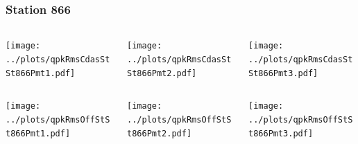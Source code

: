 \documentclass[aspectratio=169]{beamer}
\begin{document}
\begin{frame} 
  \frametitle{Station 866}
  \begin{center}
    \begin{columns}
      \begin{column}{0.33\textwidth}
        \texttt{[image: ../plots/qpkRmsCdasStSt866Pmt1.pdf]}
      \end{column}
      \begin{column}{0.33\textwidth}
        \texttt{[image: ../plots/qpkRmsCdasStSt866Pmt2.pdf]}
      \end{column}
      \begin{column}{0.33\textwidth}
        \texttt{[image: ../plots/qpkRmsCdasStSt866Pmt3.pdf]}
      \end{column}
    \end{columns}
  \end{center}

  \begin{center}
    \begin{columns}
      \begin{column}{0.33\textwidth}
        \texttt{[image: ../plots/qpkRmsOffStSt866Pmt1.pdf]}
      \end{column}
      \begin{column}{0.33\textwidth}
        \texttt{[image: ../plots/qpkRmsOffStSt866Pmt2.pdf]}
      \end{column}
      \begin{column}{0.33\textwidth}
        \texttt{[image: ../plots/qpkRmsOffStSt866Pmt3.pdf]}
      \end{column}
    \end{columns}
  \end{center}
\end{frame}
\end{document}
